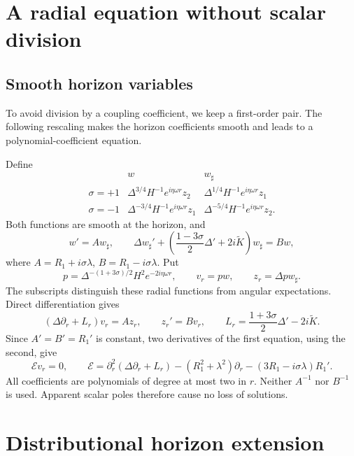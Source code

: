 \documentclass[11pt,a4paper]{article}
\begin{document}
\section{A radial equation without scalar
division}\label{a-radial-equation-without-scalar-division}

\subsection{Smooth horizon variables}\label{readable-radial-rescaling}

To avoid division by a coupling coefficient, we keep a first-order pair. The following rescaling makes the horizon coefficients smooth and leads to a polynomial-coefficient equation.

Define \[
\begin{array}{c|cc}
 &w&w_\sharp\\ \hline
 \sigma=+1&
 \Delta^{3/4}H^{-1}e^{i\eta\omega r}z_2&
 \Delta^{1/4}H^{-1}e^{i\eta\omega r}z_1\\
 \sigma=-1&
 \Delta^{-3/4}H^{-1}e^{i\eta\omega r}z_1&
 \Delta^{-5/4}H^{-1}e^{i\eta\omega r}z_2 .
\end{array}
 \tag{25}
\] Both functions are smooth at the horizon, and \[
 w'=A w_\sharp,\qquad
 \Delta w_\sharp'+
 \left(\frac{1-3\sigma}{2}\Delta'+2i\widetilde K\right)w_\sharp=B w,
 \tag{26}
\] where \(A=R_1+i\sigma\lambda\), \(B=R_1-i\sigma\lambda\). Put \[
 p=\Delta^{-(1+3\sigma)/2}H^2e^{-2i\eta\omega r},\qquad
 v_r=pw,\qquad z_r=\Delta p w_\sharp .
 \tag{27}
\] The subscripts distinguish these radial functions from angular
expectations. Direct differentiation gives \[
 (\Delta\partial_r+L_r)v_r=A z_r,\qquad z_r'=Bv_r,\qquad
 L_r=\frac{1+3\sigma}{2}\Delta'-2i\widetilde K .
 \tag{28}
\] Since \(A'=B'=R_1'\) is constant, two derivatives of the first
equation, using the second, give \[
 \mathcal E v_r=0,\qquad
 \mathcal E=
 \partial_r^2(\Delta\partial_r+L_r)
 -(R_1^2+\lambda^2)\partial_r-(3R_1-i\sigma\lambda)R_1' .
 \tag{29}
\] All coefficients are polynomials of degree at most two in \(r\).
Neither \(A^{-1}\) nor \(B^{-1}\) is used. Apparent scalar poles
therefore cause no loss of solutions.

\section{Distributional horizon
extension}\label{distributional-horizon-extension}
\end{document}
